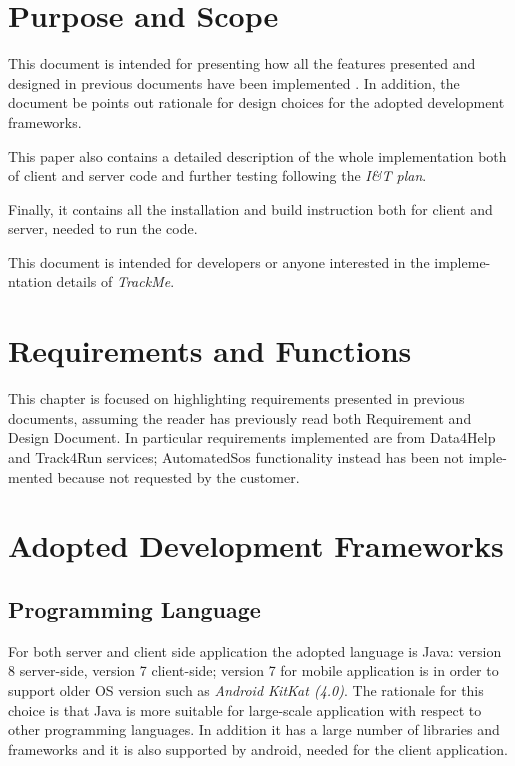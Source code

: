 \documentclass[a4paper]{article}
\begin{document}

\tableofcontents
\newpage
{}
\section{Purpose and Scope}
This document is intended for presenting how all the features presented and designed in previous documents have been implemented \cite{dd}\cite{rasd}. In addition, the document be points out rationale for design choices for the adopted development frameworks.

This paper also contains a detailed description of the whole implementation both of client and server code and further testing following the \textit{I\&T plan}.

Finally, it contains all the installation and build instruction both for client and server, needed to run the code.

This document is intended for developers or anyone interested in the impleme-\newline ntation details of \textit{TrackMe}.

\section{Requirements and Functions}
This chapter is focused on highlighting requirements presented in previous documents, assuming the reader has previously read both Requirement and Design Document. In particular requirements implemented are from Data4Help and Track4Run services; AutomatedSos functionality instead has been not imple-\newline mented because not requested by the customer.

\section{Adopted Development Frameworks}

\subsection{Programming Language}
For both server and client side application the adopted language is Java: version 8 server-side, version 7 client-side; version 7 for mobile application is in order to support older OS version such as \textit{Android KitKat (4.0)}. The rationale for this choice is that Java is more suitable for large-scale application with respect to other programming languages. In addition it has a large number of libraries and frameworks and it is also supported by android, needed for the client application.
\end{document}
